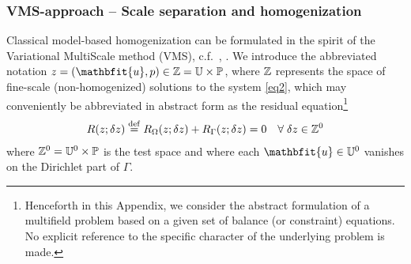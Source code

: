 \documentclass[12pt,a4paper]{article}
\renewcommand{\ta}[1]{\mathbfit{#1}}
\begin{document}
\subsubsection{VMS-approach -- Scale separation and homogenization}

Classical model-based homogenization can be formulated in the spirit of the Variational MultiScale method (VMS), c.f.\ \cite{Hughesetal1998}, \cite{LarsonMalqvist2007}.
We introduce the abbreviated notation $z = (\ta u, p) \in \set{Z} = \set U \times \set P$, where $\mathbb{Z}$ represents the space of fine-scale (non-homogenized) solutions to the system \eqref{eq2},
which may conveniently be abbreviated in abstract form as the residual equation\footnote{Henceforth in this Appendix, we consider the abstract formulation of a multifield problem based on a given set of balance (or constraint) equations.
No explicit reference to the specific character of the underlying problem is made.}
\begin{align}
 R(z; \delta z) \overset{\mathrm{def}}{=} R_\Omega(z; \delta z) + R_\Gamma(z;\delta z) = 0\quad \forall\;\delta z\in \mathbb{Z}^0
\label{eq:A1}
\end{align}
where $\mathbb{Z}^0 = \mathbb{U}^0 \times \mathbb{P}$ is the test space and where each $\ta u\in \set U^0$ vanishes on the Dirichlet part of $\Gamma$.
\end{document}
